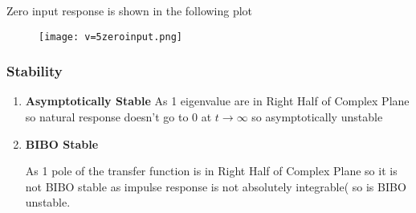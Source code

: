 \documentclass[notitlepage]{article}
\begin{document}
Zero input response is shown in the following plot
\begin{figure}[h]
    \centering
    \texttt{[image: v=5zeroinput.png]}
    \label{fig:my_label}
\end{figure}
\vspace{3mm}

\newpage
\subsubsection{Stability}
\begin{enumerate}
\item \textbf{Asymptotically Stable}
As 1  eigenvalue are in Right Half of Complex Plane so natural response doesn't go to 0 at $t\rightarrow{\infty}$ so  asymptotically unstable
\item \textbf{BIBO Stable}

As 1 pole of the transfer function is in Right Half of Complex Plane so it is not BIBO stable as impulse response is not absolutely integrable( so is BIBO unstable.
\end{enumerate}




\end{document}
